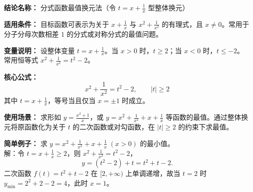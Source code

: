 \textbf{结论名称：} 分式函数最值换元法（令 $t=x+\frac{1}{x}$ 型整体换元）

\textbf{适用条件：} 目标函数可表示为关于 $x+\frac{1}{x}$ 与 $x^2+\frac{1}{x^2}$ 的有理式，且 $x \neq 0$。常用于分子分母次数相差 $1$ 的分式或对称分式的最值问题。

\textbf{变量说明：} 设整体变量 $t = x + \frac{1}{x}$。当 $x>0$ 时，$t \ge 2$；当 $x<0$ 时，$t \le -2$。常用恒等式 $x^2 + \frac{1}{x^2} = t^2 - 2$。

\textbf{核心公式：}
\[ \boxed{x^2 + \frac{1}{x^2} = t^2 - 2,\qquad |t| \ge 2} \]
其中 $t = x + \frac{1}{x}$，等号当且仅当 $x = \pm 1$ 时成立。

\textbf{使用场景：} 求形如 $y = \frac{x^2+1}{x}$，或 $y = x^2 + \frac{1}{x^2} + x + \frac{1}{x}$ 等函数的最值。通过整体换元将原函数化为关于 $t$ 的二次函数或对勾函数，在 $|t| \ge 2$ 的约束下求最值。

\textbf{简单例子：} 求 $y = x^2 + \frac{1}{x^2} + x + \frac{1}{x}\;(x>0)$ 的最小值。\\
解：令 $t = x + \frac{1}{x} \ge 2$，则 $x^2 + \frac{1}{x^2} = t^2 - 2$，
\[ y = (t^2 - 2) + t = t^2 + t - 2. \]
二次函数 $f(t) = t^2 + t - 2$ 在 $[2,+\infty)$ 上单调递增，故当 $t=2$ 时
$y_{\min} = 2^2 + 2 - 2 = 4$，此时 $x = 1$。
